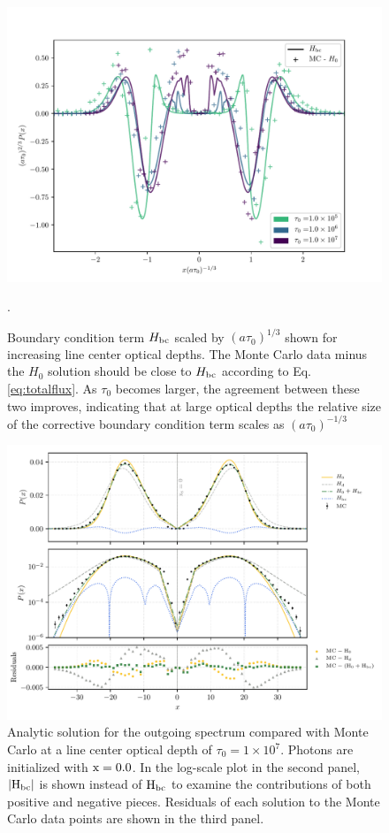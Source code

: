 \documentclass{aastex63}
\begin{document}
\ifx
\begin{figure}
    \centering
    \includegraphics{taubc.pdf}
    \caption{Boundary condition term $H_{\rm bc}$ scaled by $(a\tau_0)^{1/3}$ shown for increasing line center optical depths. The Monte Carlo data minus the $H_0$ solution should be close to $H_{\rm bc}$ according to Eq. \ref{eq:totalflux}. As $\tau_0$ becomes larger, the agreement between these two improves, indicating that at large optical depths the relative size of the corrective boundary condition term scales as $(a\tau_0)^{-1/3}$}.
    \label{fig:taubc}
\end{figure}
\fi

\begin{figure}
    \centering
    \includegraphics{final_residual.pdf}
    \caption{Analytic solution for the outgoing spectrum compared with Monte Carlo at a line center optical depth of $\tau_0 = 1 \times 10^7$. Photons are initialized with $\rm x = 0.0$. In the log-scale plot in the second panel, $|\rm H_{bc}|$ is shown instead of $\rm H_{bc}$ to examine the contributions of both positive and negative pieces. Residuals of each solution to the Monte Carlo data points are shown in the third panel.} 
    \label{fig:sol_mc_residual_0}
\end{figure}
\end{document}
